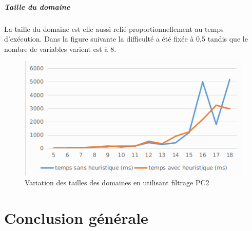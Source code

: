 \documentclass[12pt]{report}
\begin{document}
\paragraph{Taille du domaine}
La taille du domaine est elle aussi relié proportionnellement  au temps d’exécution. Dans la figure suivante la difficulté a été fixée à 0,5 tandis que le nombre de variables varient est à 8.
\begin{figure}[H]
	\centering
	\includegraphics[scale=0.5]{imgs/domain.png}
	\caption{Variation des tailles des domaines en utilisant filtrage PC2}
	\label{fig:doms}
\end{figure}
\chapter{Conclusion générale}
\paragraph{}
\end{document}
